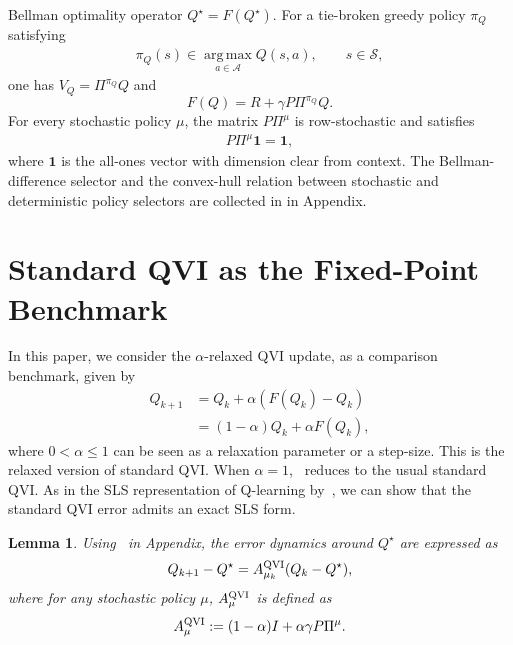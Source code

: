 \documentclass[letterpaper]{article}
\numberwithin{equation}{section}
\newtheorem{lemma}{Lemma}[section]
\begin{document}
Bellman optimality operator $Q^\star=F(Q^\star)$.
For a tie-broken greedy policy $\pi_Q$ satisfying
\begin{align*}
  \pi_Q(s)\in\operatorname*{arg\,max}_{a\in\mathcal A}Q(s,a),
  \qquad s\in\mathcal S,
\end{align*}
one has $V_Q=\Pi^{\pi_Q}Q$ and
\begin{equation*}
  F(Q)=R+\gamma P\Pi^{\pi_Q}Q.
\end{equation*}
For every stochastic policy $\mu$, the matrix $P\Pi^\mu$ is row-stochastic and
satisfies
\begin{align}
  P\Pi^\mu\mathbf{1}=\mathbf{1},\label{eq:policy-selector-row-stochastic}
\end{align}
where $\mathbf{1}$ is the all-ones vector with dimension clear from context. The
Bellman-difference selector and the convex-hull relation between stochastic and
deterministic policy selectors are collected in  in Appendix.


\section{Standard QVI as the Fixed-Point Benchmark}
\label{sec:standard_q_baseline}

In this paper, we consider the $\alpha$-relaxed QVI update, as a comparison benchmark, given by
\begin{equation}
\begin{aligned}
Q_{k+1}
&=Q_k+\alpha(F(Q_k)-Q_k)\\
&=(1-\alpha)Q_k+\alpha F(Q_k),
\end{aligned}
\label{eq:standard-q-update}
\end{equation}
where $0<\alpha\le1$ can be seen as a relaxation parameter or a step-size.
This is the relaxed version of standard QVI. When $\alpha=1$,~ reduces to the usual standard QVI. As in the SLS representation of Q-learning by~\citet{lee2026lyapunovcertified}, we can show that the standard QVI error admits an exact SLS form.
\begin{lemma}
\label{lem:standard-q-error-system}
Using~ in Appendix, the error
dynamics around $Q^\star$ are expressed as
\begin{equation*}
  Q_{k+1}-Q^\star
  =A_{\mu_k}^{\rm QVI}(Q_k-Q^\star),
\end{equation*}
where for any stochastic policy $\mu$, $A_\mu^{\rm QVI}$ is defined as
\begin{align*}
  A_\mu^{\rm QVI}:=(1-\alpha)I+\alpha\gamma P\Pi^\mu.
\end{align*}
\end{lemma}
\end{document}

